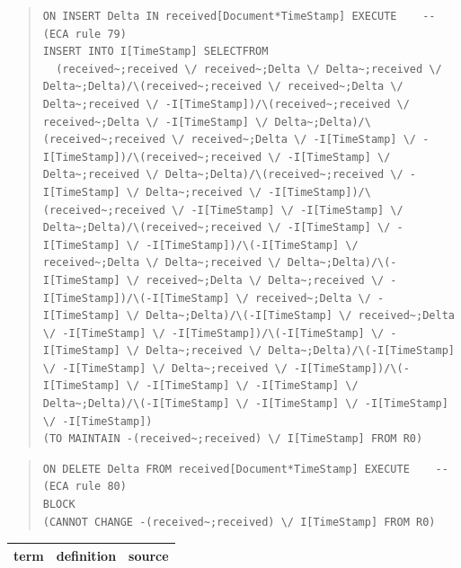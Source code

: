 \documentclass[10pt,a4paper]{report}              %
\theoremstyle{plain}\theorembodyfont{\rmfamily}\newtheorem{definition}{Definition}[section]
\theoremstyle{plain}\theorembodyfont{\rmfamily}\newtheorem{designrule}[definition]{Requirement}
\begin{document}
\begin{quote}
\begin{verbatim}
ON INSERT Delta IN received[Document*TimeStamp] EXECUTE    -- (ECA rule 79)
INSERT INTO I[TimeStamp] SELECTFROM
  (received~;received \/ received~;Delta \/ Delta~;received \/ Delta~;Delta)/\(received~;received \/ received~;Delta \/ Delta~;received \/ -I[TimeStamp])/\(received~;received \/ received~;Delta \/ -I[TimeStamp] \/ Delta~;Delta)/\(received~;received \/ received~;Delta \/ -I[TimeStamp] \/ -I[TimeStamp])/\(received~;received \/ -I[TimeStamp] \/ Delta~;received \/ Delta~;Delta)/\(received~;received \/ -I[TimeStamp] \/ Delta~;received \/ -I[TimeStamp])/\(received~;received \/ -I[TimeStamp] \/ -I[TimeStamp] \/ Delta~;Delta)/\(received~;received \/ -I[TimeStamp] \/ -I[TimeStamp] \/ -I[TimeStamp])/\(-I[TimeStamp] \/ received~;Delta \/ Delta~;received \/ Delta~;Delta)/\(-I[TimeStamp] \/ received~;Delta \/ Delta~;received \/ -I[TimeStamp])/\(-I[TimeStamp] \/ received~;Delta \/ -I[TimeStamp] \/ Delta~;Delta)/\(-I[TimeStamp] \/ received~;Delta \/ -I[TimeStamp] \/ -I[TimeStamp])/\(-I[TimeStamp] \/ -I[TimeStamp] \/ Delta~;received \/ Delta~;Delta)/\(-I[TimeStamp] \/ -I[TimeStamp] \/ Delta~;received \/ -I[TimeStamp])/\(-I[TimeStamp] \/ -I[TimeStamp] \/ -I[TimeStamp] \/ Delta~;Delta)/\(-I[TimeStamp] \/ -I[TimeStamp] \/ -I[TimeStamp] \/ -I[TimeStamp])
(TO MAINTAIN -(received~;received) \/ I[TimeStamp] FROM R0)
\end{verbatim}
\end{quote}
\begin{quote}
\begin{verbatim}
ON DELETE Delta FROM received[Document*TimeStamp] EXECUTE    -- (ECA rule 80)
BLOCK
(CANNOT CHANGE -(received~;received) \/ I[TimeStamp] FROM R0)
\end{verbatim}
\end{quote}
\begin{center}
\begin{tabular}{lll}
term & definition & source\\
\hline
\end{tabular}
\end{center}
\end{document}
